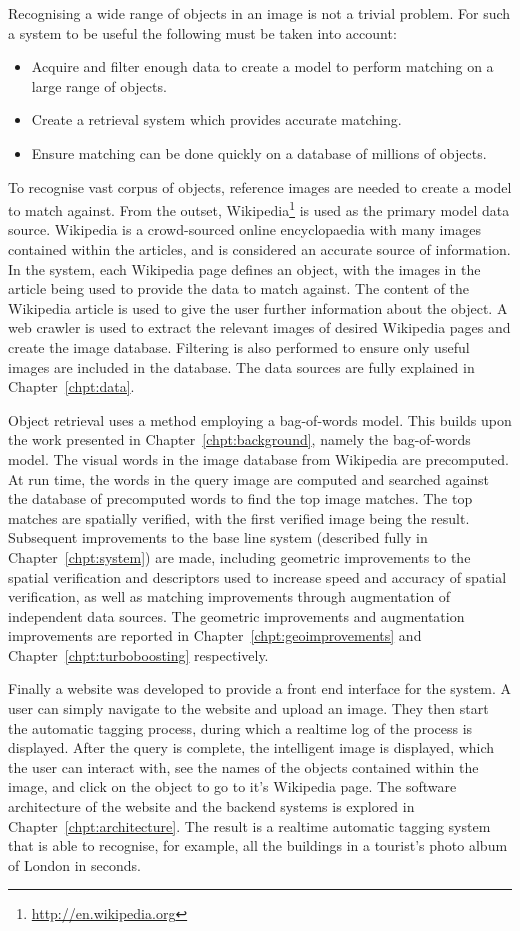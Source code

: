 \documentclass[11pt, onecolumn, a4paper, final]{report} %
\begin{document}
Recognising a wide range of objects in an image is not a trivial problem. For such a system to be useful the following must be taken into account:
\begin{itemize}
\item Acquire and filter enough data to create a model to perform matching on a large range of objects.
\item Create a retrieval system which provides accurate matching.
\item Ensure matching can be done quickly on a database of millions of objects.
\end{itemize}

To recognise vast corpus of objects, reference images are needed to create a model to match against. From the outset, Wikipedia\footnote{\url{http://en.wikipedia.org}} is used as the primary model data source. Wikipedia is a crowd-sourced online encyclopaedia with many images contained within the articles, and is considered an accurate source of information. In the system, each Wikipedia page defines an object, with the images in the article being used to provide the data to match against. The content of the Wikipedia article is used to give the user further information about the object. A web crawler is used to extract the relevant images of desired Wikipedia pages and create the image database. Filtering is also performed to ensure only useful images are included in the database. The data sources are fully explained in Chapter~\ref{chpt:data}.

Object retrieval uses a method employing a bag-of-words model. This builds upon the work presented in Chapter~\ref{chpt:background}, namely the bag-of-words model. The visual words in the image database from Wikipedia are precomputed. At run time, the words in the query image are computed and searched against the database of precomputed words to find the top image matches. The top matches are spatially verified, with the first verified image being the result. Subsequent improvements to the base line system (described fully in Chapter~\ref{chpt:system}) are made, including geometric improvements to the spatial verification and descriptors used to increase speed and accuracy of spatial verification, as well as matching improvements through augmentation of independent data sources. The geometric improvements and augmentation improvements are reported in Chapter~\ref{chpt:geoimprovements} and Chapter~\ref{chpt:turboboosting} respectively.

Finally a website was developed to provide a front end interface for the system. A user can simply navigate to the website and upload an image. They then start the automatic tagging process, during which a realtime log of the process is displayed. After the query is complete, the intelligent image is displayed, which the user can interact with, see the names of the objects contained within the image, and click on the object to go to it's Wikipedia page. The software architecture of the website and the backend systems is explored in Chapter~\ref{chpt:architecture}. The result is a realtime automatic tagging system that is able to recognise, for example, all the buildings in a tourist's photo album of London in seconds.
\end{document}
